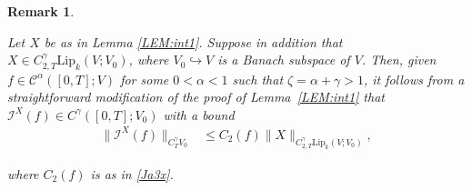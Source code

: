 \documentclass[letterpaper, 11pt,  reqno]{amsart}
\newtheorem{remark}[theorem]{Remark}
\newcommand{\1}{\hspace{0.5mm}\text{I}\hspace{0.5mm}}
\newcommand{\I}{\mathcal{I}}
\newcommand{\noi}{\noindent}
\newcommand{\CC}{\mathcal{C}}
\newcommand{\al}{\alpha}
\newcommand{\g}{\gamma}
\newcommand{\Lip}{\mathrm{Lip}}
\newcommand{\z}{\zeta}
\numberwithin{equation}{section}
\numberwithin{theorem}{section}
\begin{document}
\begin{remark}\label{REM:nonlin}\rm

Let $X$ be as in Lemma \ref{LEM:int1}.
Suppose in addition that  $X\in C^\g_{2,T}\Lip_k(V; V_0)$,
 where   $V_0 \hookrightarrow V$
is a Banach subspace of $V$.
Then, given 
  $f\in \CC^{\al}([0,T];V)$ for some $0 < \al < 1$
  such that $\z = \al + \g > 1$, 
it follows from a straightforward modification of the proof of Lemma~\ref{LEM:int1}
that 
$\I^X(f)\in C^\g([0,T]; V_0)$
with a bound
\begin{align*}
\|\I^X(f)\|_{C^\g_T  V_0} 
& \leq
C_2(f)
\|X\|_{C^\g_{2,T}\Lip_k(V; V_0)}, 
\end{align*}


\noi
where $C_2(f)$ is as in \eqref{Ja3x}.

\end{remark}
\end{document}
